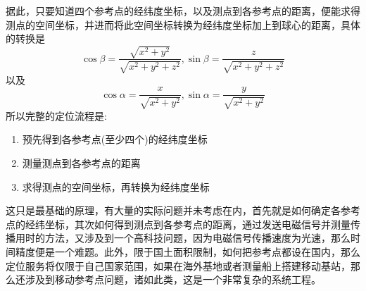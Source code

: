 \begin{example}[卫星定位原理]
 据此，只要知道四个参考点的经纬度坐标，以及测点到各参考点的距离，便能求得测点的空间坐标，并进而将此空间坐标转换为经纬度坐标加上到球心的距离，具体的转换是
 \[ \cos{\beta} = \frac{\sqrt{x^2+y^2}}{\sqrt{x^2+y^2+z^2}}, \sin{\beta} = \frac{z}{\sqrt{x^2+y^2+z^2}} \]
 以及
 \[ \cos{\alpha} = \frac{x}{\sqrt{x^2+y^2}}, \sin{\alpha} = \frac{y}{\sqrt{x^2+y^2}} \]
 所以完整的定位流程是:
 \begin{enumerate}
 \item 预先得到各参考点(至少四个)的经纬度坐标
 \item 测量测点到各参考点的距离
 \item 求得测点的空间坐标，再转换为经纬度坐标
 \end{enumerate}
 这只是最基础的原理，有大量的实际问题并未考虑在内，首先就是如何确定各参考点的经纬坐标，其次如何得到测点到各参考点的距离，通过发送电磁信号并测量传播用时的方法，又涉及到一个高科技问题，因为电磁信号传播速度为光速，那么时间精度便是一个难题。此外，限于国土面积限制，如何把参考点都设在国内，那么定位服务将仅限于自己国家范围，如果在海外基地或者测量船上搭建移动基站，那么还涉及到移动参考点问题，诸如此类，这是一个非常复杂的系统工程。
 \end{example}
